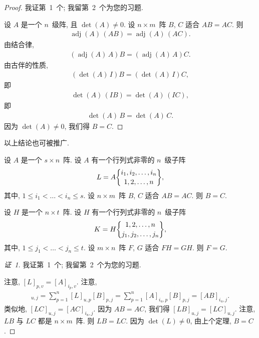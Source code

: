\documentclass[../libro.tex]{subfiles}
\begin{document}
\begin{proof}
    我证第~1~个; 我留第~2~个为您的习题.

    设 \(A\) 是一个 \(n\)~级阵, 且 \(\det {(A)} \neq 0\).
    设 \(n \times m\)~阵 \(B\), \(C\) 适合 \(AB = AC\).
    则
    \begin{align*}
        \operatorname{adj} {(A)}\, (AB)
        = \operatorname{adj} {(A)}\, (AC).
    \end{align*}
    由结合律,
    \begin{align*}
        (\operatorname{adj} {(A)}\, A) B
        = (\operatorname{adj} {(A)}\, A) C.
    \end{align*}
    由古伴的性质,
    \begin{align*}
        (\det {(A)}\, I) B = (\det {(A)}\, I) C,
    \end{align*}
    即
    \begin{align*}
        \det {(A)}\, (I B) = \det {(A)}\, (I C),
    \end{align*}
    即
    \begin{align*}
        \det {(A)}\, B = \det {(A)}\, C.
    \end{align*}
    因为 \(\det {(A)} \neq 0\),
    我们得 \(B = C\).
\end{proof}

以上结论也可被推广.

\begin{theorem}
    设 \(A\) 是一个 \(s \times n\)~阵.
    设 \(A\) 有一个行列式非零的 \(n\)~级子阵
    \begin{align*}
        L = A\submat{i_1,i_2,\dots,i_n}{1,2,\dots,n},
    \end{align*}
    其中, \(1 \leq i_1 < \dots < i_n \leq s\).
    设 \(n \times m\)~阵 \(B\), \(C\) 适合 \(AB = AC\).
    则 \(B = C\).

    设 \(H\) 是一个 \(n \times t\)~阵.
    设 \(H\) 有一个行列式非零的 \(n\)~级子阵
    \begin{align*}
        K = H\submat{1,2,\dots,n}{j_1,j_2,\dots,j_n},
    \end{align*}
    其中, \(1 \leq j_1 < \dots < j_n \leq t\).
    设 \(m \times n\)~阵 \(F\), \(G\) 适合 \(FH = GH\).
    则 \(F = G\).
\end{theorem}

\begin{proof}[证~1]
    我证第~1~个; 我留第~2~个为您的习题.

    注意, \([L]_{p,v} = [A]_{i_p,v}\).
    注意,
    \begin{align*}
        [L B]_{u,j}
        =
        \sum_{p = 1}^{n} {[L]_{u,p} [B]_{p,j}}
        =
        \sum_{p = 1}^{n} {[A]_{i_u,p} [B]_{p,j}}
        =
        [A B]_{i_u,j}.
    \end{align*}
    类似地, \([L C]_{u,j} = [A C]_{i_u,j}\).
    因为 \(A B = A C\),
    我们得 \([L B]_{u,j} = [L C]_{u,j}\).
    注意, \(L B\) 与 \(L C\) 都是 \(n \times m\)~阵.
    则 \(L B = L C\).
    因为 \(\det {(L)} \neq 0\),
    由上个定理, \(B = C\).
\end{proof}
\end{document}
